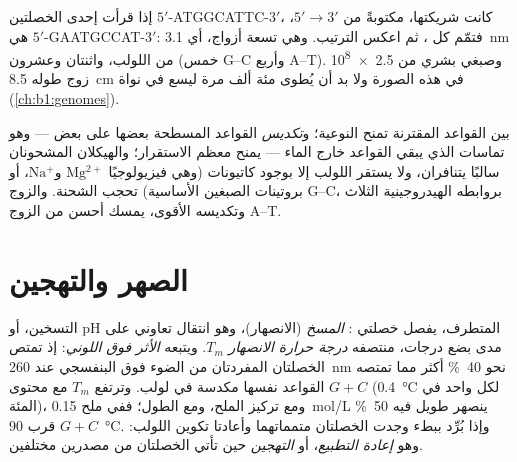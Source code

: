 \begin{example}\label{ex:b1:nucleic-acids:complement}
إذا قرأت إحدى الخصلتين $5'$-ATGGCATTC-$3'$، كانت شريكتها،
مكتوبةً من $5' \to 3'$، هي $5'$-GAATGCCAT-$3'$: فتمّم كل ، ثم
اعكس الترتيب. وهي تسعة أزواج، أي \qty{3.1}{nm} من اللولب، واثنتان
وعشرون  (خمس G--C وأربع A--T). وصبغي بشري من
\num{2.5e8} زوج طوله \qty{8.5}{cm} في هذه الصورة ولا بد أن يُطوى
مئة ألف مرة ليسع في نواة (\cref{ch:b1:genomes}).
\end{example}

\begin{proposition}\label{prop:b1:nucleic-acids:stability}
 بين القواعد المقترنة تمنح النوعية؛
و\emph{تكديس} القواعد المسطحة بعضها على بعض ---
وهو تماسات   الذي يبقي القواعد خارج
الماء --- يمنح معظم الاستقرار؛ والهيكلان المشحونان سالبًا يتنافران،
ولا يستقر اللولب إلا بوجود كاتيونات (وهي فيزيولوجيًا
$\mathrm{Mg^{2+}}$ و$\mathrm{Na^+}$، أو بروتينات الصبغين الأساسية)
تحجب الشحنة. والزوج G--C، بروابطه الهيدروجينية الثلاث وتكديسه الأقوى،
يمسك أحسن من الزوج A--T.
\end{proposition}

\section{الصهر والتهجين}

\begin{definition}\label{def:b1:nucleic-acids:melting}
التسخين، أو pH المتطرف، يفصل خصلتي :
\emph{المسخ} (الانصهار)، وهو انتقال تعاوني على مدى
بضع درجات، منتصفه \emph{درجة حرارة
الانصهار} $T_m$. ويتبعه \emph{الأثر فوق
اللوني}: إذ تمتص الخصلتان المفردتان من الضوء فوق البنفسجي عند
\qty{260}{nm} نحو \qty{40}{\%} أكثر مما تمتصه القواعد نفسها مكدسة في
لولب. وترتفع $T_m$ مع محتوى $G + C$ (\qty{0.4}{\celsius} لكل واحد في
المئة)، ومع تركيز الملح، ومع الطول؛ ففي ملح \qty{0.15}{mol/L} ينصهر
 طويل فيه \qty{50}{\%} $G + C$ قرب \qty{90}{\celsius}. وإذا
بُرِّد ببطء وجدت الخصلتان متمماتهما وأعادتا تكوين اللولب: وهو
\emph{إعادة التطبيع}، أو \emph{التهجين} حين تأتي
الخصلتان من مصدرين مختلفين.
\end{definition}

